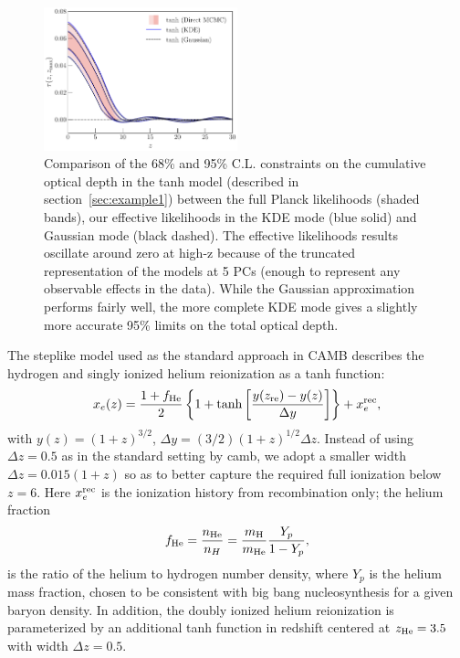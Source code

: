\documentclass[prd,twocolumn,amsmath,amssymb,floatfix,superscriptaddress,nofootinbib]{revtex4-1}
\newcommand{\refsec}[1]{section~\ref{sec:#1}}
\newcommand{\beq}{\begin{equation}}
\newcommand{\eeq}{\end{equation}}
\begin{document}
\begin{figure}[ht]
\includegraphics[width=0.5\textwidth]{paper/plots/pl18_taugtz_tanh_direct_vs_kde_vs_gaussian.pdf}
\caption{Comparison of the 68\% and 95\% C.L. constraints on the cumulative optical depth in the tanh model (described in \refsec{example1}) between the full Planck likelihoods (shaded bands), our effective likelihoods in the KDE mode (blue solid) and Gaussian mode (black dashed). The effective likelihoods results oscillate around zero at high-z because of the truncated representation of the models at 5 PCs (enough to represent any observable effects in the data). While the Gaussian approximation performs fairly well, the more complete KDE mode gives a slightly more accurate 95\% limits on the total optical depth.}
\label{fig:plot_taugtz_PC_vs_tanh}
\end{figure}

The steplike model used as the standard approach in CAMB describes the hydrogen and singly ionized helium reionization as a tanh function:
%
 \begin{equation}
x_e(z) = \frac{1+f_{\rm He}}{2}\left\{  1+ \tanh\left[ \frac{y(z_{\rm re})-y(z)}{\Delta y} \right] \right\} + x_e^{\rm rec},
 \label{eqn:tanh_1D}
 \end{equation}
 with $y(z)=(1+z)^{3/2}$, $\Delta y=(3/2)(1+z)^{1/2}\Delta z$. Instead of using $\Delta z = 0.5$ as in the standard setting by camb, we adopt a smaller width $\Delta z = 0.015(1+z)$ so as to better capture the required full ionization below $z=6$. Here $x_e^{\rm rec}$ is the ionization history from recombination only; the helium fraction
 \beq
 f_{\rm He} = \frac{n_{\rm He}}{n_{H}} = \frac{m_{\rm H}}{m_{\rm He}} \frac{Y_p}{1 - Y_p}, 
 \eeq
 is the ratio of the helium to hydrogen number density, where $Y_p$ is the helium mass fraction, chosen to be consistent with big bang nucleosynthesis for a given baryon density. In addition, the doubly ionized helium reionization is parameterized by an additional tanh function in redshift centered at $z_{\rm He} = 3.5$ with width $\Delta z = 0.5$.
\end{document}
